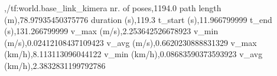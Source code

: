 ,/tf:world.base_link_kimera
nr. of poses,1194.0
path length (m),78.97935450375776
duration (s),119.3
t_start (s),11.966799999
t_end (s),131.266799999
v_max (m/s),2.253642526678923
v_min (m/s),0.02412108437109423
v_avg (m/s),0.6620230888831329
v_max (km/h),8.113113096044122
v_min (km/h),0.08683590373593923
v_avg (km/h),2.3832831199792786
